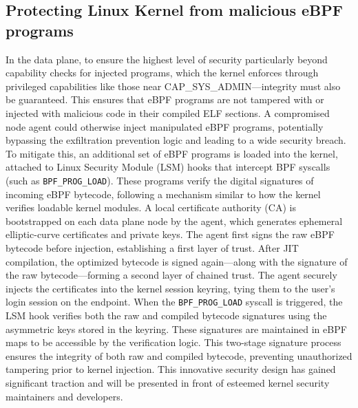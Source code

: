 \documentclass [11pt, proquest] {uwthesis}[2020/02/24]
\begin{document}
\subsection{Protecting Linux Kernel from malicious eBPF programs}
In the data plane, to ensure the highest level of security particularly beyond capability checks for injected programs, which the kernel enforces through privileged capabilities like those near CAP\_SYS\_ADMIN—integrity must also be guaranteed. This ensures that eBPF programs are not tampered with or injected with malicious code in their compiled ELF sections. A compromised node agent could otherwise inject manipulated eBPF programs, potentially bypassing the exfiltration prevention logic and leading to a wide security breach. To mitigate this, an additional set of eBPF programs is loaded into the kernel, attached to Linux Security Module (LSM) hooks that intercept BPF syscalls (such as \texttt{BPF\_PROG\_LOAD}). These programs verify the digital signatures of incoming eBPF bytecode, following a mechanism similar to how the kernel verifies loadable kernel modules. A local certificate authority (CA) is bootstrapped on each data plane node by the agent, which generates ephemeral elliptic-curve certificates and private keys. The agent first signs the raw eBPF bytecode before injection, establishing a first layer of trust. After JIT compilation, the optimized bytecode is signed again—along with the signature of the raw bytecode—forming a second layer of chained trust. The agent securely injects the certificates into the kernel session keyring, tying them to the user’s login session on the endpoint. When the \texttt{BPF\_PROG\_LOAD} syscall is triggered, the LSM hook verifies both the raw and compiled bytecode signatures using the asymmetric keys stored in the keyring. These signatures are maintained in eBPF maps to be accessible by the verification logic. This two-stage signature process ensures the integrity of both raw and compiled bytecode, preventing unauthorized tampering prior to kernel injection. This innovative security design has gained significant traction and will be presented in front of esteemed kernel security maintainers and developers.
\end{document}
